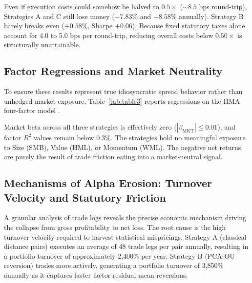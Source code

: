 Even if execution costs could somehow be halved to $0.5\times$ ($\sim 8.5$ bps round-trip), Strategies A and C still lose money ($-7.83\%$ and $-8.58\%$ annually). Strategy B barely breaks even ($+0.58\%$, Sharpe $+0.06$). Because fixed statutory taxes alone account for 4.0 to 5.0 bps per round-trip, reducing overall costs below $0.50\times$ is structurally unattainable.

\subsection{Factor Regressions and Market Neutrality}
To ensure these results represent true idiosyncratic spread behavior rather than unhedged market exposure, Table~\ref{tab:table3} reports regressions on the IIMA four-factor model \citep{agarwalla2014four}.

\begin{table}[htbp]
\centering
\caption{Risk Factor Loadings and Institutional Alphas}
\label{tab:table3}
\end{table}

Market beta across all three strategies is effectively zero ($|\beta_{\text{MKT}}| \le 0.01$), and factor $R^2$ values remain below 0.3\%. The strategies hold no meaningful exposure to Size (SMB), Value (HML), or Momentum (WML). The negative net returns are purely the result of trade friction eating into a market-neutral signal.


\subsection{Mechanisms of Alpha Erosion: Turnover Velocity and Statutory Friction}
A granular analysis of trade logs reveals the precise economic mechanism driving the collapse from gross profitability to net loss. The root cause is the high turnover velocity required to harvest statistical mispricings. Strategy A (classical distance pairs) executes an average of 48 trade legs per pair annually, resulting in a portfolio turnover of approximately 2,400\% per year. Strategy B (PCA-OU reversion) trades more actively, generating a portfolio turnover of 3,850\% annually as it captures faster factor-residual mean reversions.


